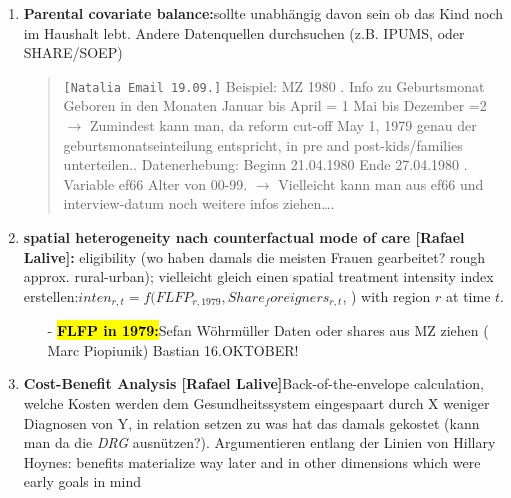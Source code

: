 \documentclass[11pt,a4paper]{article}
\begin{document}
{\begin{enumerate}
\item \textbf{Parental covariate balance:}\newline sollte unabhängig davon sein ob das Kind noch im Haushalt lebt. Andere Datenquellen durchsuchen (z.B. IPUMS, oder SHARE/SOEP)
\begin{quote}
	\texttt{[Natalia Email 19.09.]}\newline
	Beispiel: MZ 1980 .	Info zu Geburtsmonat   Geboren in den Monaten
	Januar bis April = 1
	Mai bis Dezember  =2 \newline
	$\rightarrow$	Zumindest kann man, da reform cut-off May 1, 1979 genau der 	geburtsmonatseinteilung entspricht, in pre and post-kids/families unterteilen..	Datenerhebung: 
	Beginn 21.04.1980 
	Ende 27.04.1980 . Variable ef66 Alter von 00-99.\newline
	$\rightarrow$	Vielleicht kann man aus ef66 und interview-datum noch weitere infos ziehen….
\end{quote}


\item  \textbf{spatial heterogeneity nach counterfactual mode of care [Rafael Lalive]:} \newline eligibility (wo haben damals die meisten Frauen gearbeitet? rough approx. rural-urban); vielleicht gleich einen spatial treatment intensity index erstellen:\newline $inten_{r,t}=f(FLFP_{r,1979}, Share_foreigners_{r,t}$, ) \newline
with region $r$ at time $t$. 
\begin{itemize}
	\item[-] \textbf{\hl{FLFP in 1979:}}\newline Sefan Wöhrmüller Daten oder shares aus MZ ziehen (	Marc Piopiunik) Bastian 16.OKTOBER!
\end{itemize}


\item \textbf{Cost-Benefit Analysis [Rafael Lalive]}\newline Back-of-the-envelope calculation, welche Kosten werden dem Gesundheitssystem eingespaart durch X weniger Diagnosen von Y, in relation setzen zu was hat das damals gekostet (kann man da die \textit{DRG} ausnützen?). Argumentieren entlang der Linien von Hillary Hoynes: benefits materialize way later and in other dimensions which were early goals in mind



\end{enumerate}}
\end{document}
